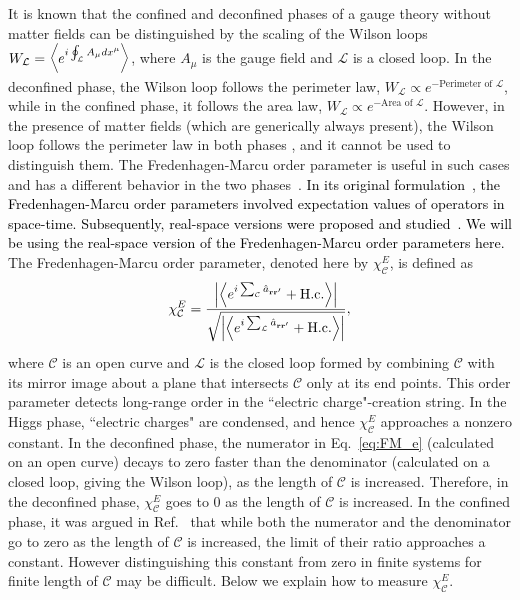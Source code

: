 \documentclass[twocolumn,superscriptaddress,amsmath,amssymb,aps,prx,nofootinbib]{revtex4-2}
\newcommand{\newtext}[1]{\textcolor{black}{#1}}
\begin{document}
It is known that the confined and deconfined phases of a gauge theory without matter fields can be distinguished by the scaling of the Wilson loops $W_\mathcal{L} = \expval{ e^{i \oint_\mathcal{L} A_\mu dx^\mu} }$, where $A_\mu$ is the gauge field and $\mathcal{L}$ is a closed loop. In the deconfined phase, the Wilson loop follows the perimeter law, $W_{\mathcal{L}} \propto e^{-\text{Perimeter of }\mathcal{L}}$, while in the confined phase, it follows the area law, $W_{\mathcal{L}} \propto e^{-\text{Area of }\mathcal{L}}$. However, in the presence of matter fields (which are generically always present), the Wilson loop follows the perimeter law in both phases \cite{fradkin2013field,shankar2017quantum}, and it cannot be used to distinguish  them. The Fredenhagen-Marcu order parameter is useful in such cases and has  a different behavior in the two phases~\cite{fredenhagen1983charged,fredenhagen1986,fredenhagen1988dual,marcu1986uses,bricmont1983order,gregor2011diagnosing,verresen2021,semeghini2021}. 
\newtext{In its original formulation~\cite{fredenhagen1983charged}, the Fredenhagen-Marcu order parameters involved expectation values of operators in space-time. Subsequently, real-space versions were proposed and studied~\cite{fredenhagen1988dual,gregor2011diagnosing,verresen2021,xu2024critical}. We will be using the real-space version of the Fredenhagen-Marcu order parameters here.}
The Fredenhagen-Marcu order parameter, denoted here by $\chi^E_{\mathcal{C}}$, is defined as
\begin{equation} \label{eq:FM_e}
  \chi_{\mathcal{C}}^E = \frac{\abs{ \expval{ e^{i\sum_\mathcal{C} \hat{a}_{\vb{r}\vb{r}'}  } +\text{H.c.} } } }{\sqrt{ \abs{ \expval{ e^{i \sum_{\mathcal{L}} \hat{a}_{\vb{r} \vb{r}'} } + \text{H.c.} }  }}},
\end{equation}
where $\mathcal{C}$ is an open curve and $\mathcal{L}$ is the closed loop formed by combining $\mathcal{C}$ with its mirror image about a plane that intersects $\mathcal{C}$ only at its end points. This order parameter detects long-range order in the ``electric charge"-creation string. In the Higgs phase, ``electric charges" are condensed, and hence $\chi_{\mathcal{C}}^E$ approaches a nonzero constant. In the deconfined phase, the numerator in Eq.~\eqref{eq:FM_e} (calculated on an open curve) decays to zero faster than the denominator (calculated on a closed loop, giving the Wilson loop), as the length of $\mathcal{C}$ is increased. Therefore, in the deconfined phase, $\chi_{\mathcal{C}}^E$ goes to 0 as the length of $\mathcal{C}$ is increased. In the confined phase, it was argued in Ref.~\cite{fredenhagen1986} that while both the numerator and the denominator go to zero as the length of $\mathcal{C}$ is increased, the limit of their ratio approaches a constant. However distinguishing this constant from zero in finite systems for finite length of $\mathcal{C}$ may be difficult.
Below we explain how to measure $\chi_{\mathcal{C}}^E$. 
\end{document}
